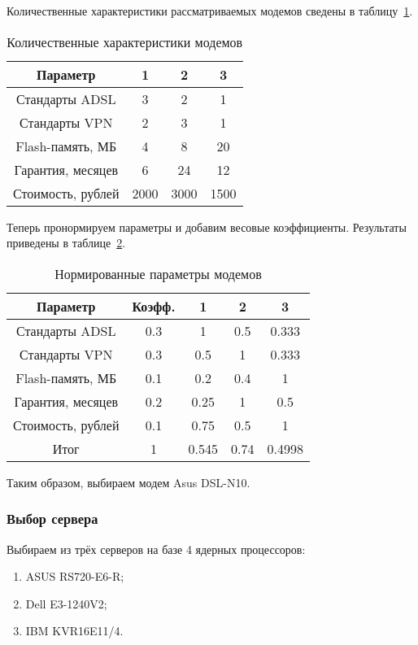 Количественные характеристики рассматриваемых модемов сведены в таблицу~\ref{table:modem_compare_numb}.

\begin{table}[h]
\caption{Количественные характеристики модемов}
\label{table:modem_compare_numb}
\centering
  \begin{tabular}{|c|c|c|c|}
  \hline Параметр & 1 & 2 & 3 \\
  \hline Стандарты ADSL & 3 & 2 & 1 \\
  \hline Стандарты VPN & 2 & 3 & 1 \\
  \hline Flash-память, МБ & 4 & 8 & 20 \\
  \hline Гарантия, месяцев & 6 & 24 & 12 \\
  \hline Стоимость, рублей & 2000 & 3000 & 1500 \\
  \hline
  \end{tabular}
\end{table}

Теперь пронормируем параметры и добавим весовые коэффициенты. Результаты приведены в таблице~\ref{table:modem_compare}.

\begin{table}[h]
\caption{Нормированные параметры модемов}
\label{table:modem_compare}
\centering
  \begin{tabular}{|c|c|c|c|c|}
  \hline Параметр          & Коэфф. & 1      & 2      & 3 \\
  \hline Стандарты ADSL    & 0.3    & 1      & 0.5    & 0.333 \\
  \hline Стандарты VPN     & 0.3    & 0.5    & 1      & 0.333 \\
  \hline Flash-память, МБ  & 0.1    & 0.2    & 0.4    & 1 \\
  \hline Гарантия, месяцев & 0.2    & 0.25   & 1      & 0.5 \\
  \hline Стоимость, рублей & 0.1    & 0.75   & 0.5    & 1 \\
  \hline Итог              & 1      & 0.545  & 0.74   & 0.4998 \\
  \hline
  \end{tabular}
\end{table}

Таким образом, выбираем модем Asus DSL-N10.

\subsubsection{Выбор сервера}

Выбираем из трёх серверов на базе 4 ядерных процессоров:
\begin{enumerate}
\item ASUS RS720-E6-R;
\item Dell E3-1240V2;
\item IBM KVR16E11/4.
\end{enumerate}


